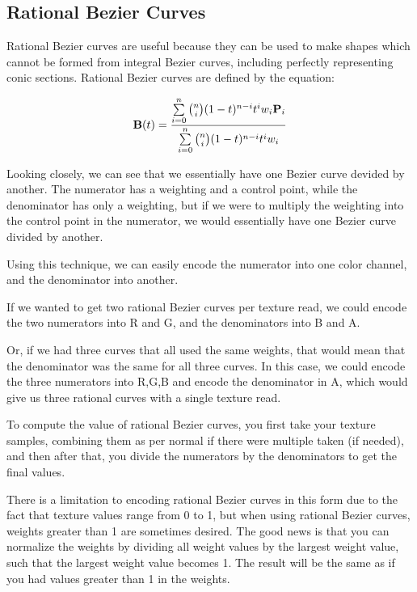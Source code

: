 \documentclass{jcgt}
\begin{document}
\subsection{Rational Bezier Curves}

Rational Bezier curves are useful because they can be used to make shapes which cannot be formed from integral Bezier curves, including perfectly representing conic sections.  Rational Bezier curves are defined by the equation:

\begin{equation}
\text{\bf{B}}(t) = \frac
                {\sum\limits_{i=0}^n\binom {n} {i}(1-t)^{n-i}t^iw_i\text{\bf{P}}_i}
                {\sum\limits_{i=0}^n\binom {n} {i}(1-t)^{n-i}t^iw_i}
\label{eqn:rationalbezier}                
\end{equation}

Looking closely, we can see that we essentially have one Bezier curve devided by another.  The numerator has a weighting and a control point, while the denominator has only a weighting, but if we were to multiply the weighting into the control point in the numerator, we would essentially have one Bezier curve divided by another.

Using this technique, we can easily encode the numerator into one color channel, and the denominator into another.

If we wanted to get two rational Bezier curves per texture read, we could encode the two numerators into R and G, and the denominators into B and A.

Or, if we had three curves that all used the same weights, that would mean that the denominator was the same for all three curves.  In this case, we could encode the three numerators into R,G,B and encode the denominator in A, which would give us three rational curves with a single texture read.

To compute the value of rational Bezier curves, you first take your texture samples, combining them as per normal if there were multiple taken (if needed), and then after that, you divide the numerators by the denominators to get the final values.

There is a limitation to encoding rational Bezier curves in this form due to the fact that texture values range from 0 to 1, but when using rational Bezier curves, weights greater than 1 are sometimes desired.  The good news is that you can normalize the weights by dividing all weight values by the largest weight value, such that the largest weight value becomes 1.  The result will be the same as if you had values greater than 1 in the weights.
\end{document}
